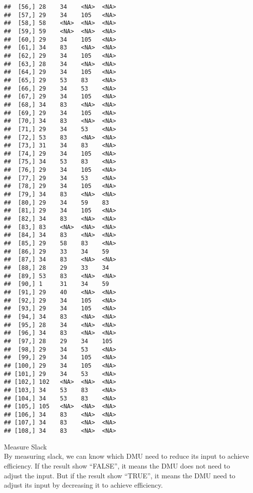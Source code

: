 \documentclass[
]{article}
\newenvironment{Shaded}{\begin{snugshade}}{\end{snugshade}}
\newcommand{\FunctionTok}[1]{\textcolor[rgb]{0.00,0.00,0.00}{#1}}
\newcommand{\NormalTok}[1]{#1}
\newcommand{\OtherTok}[1]{\textcolor[rgb]{0.56,0.35,0.01}{#1}}
\newcommand{\SpecialCharTok}[1]{\textcolor[rgb]{0.00,0.00,0.00}{#1}}
\begin{document}
\begin{verbatim}
##  [56,] 28    34    <NA>  <NA> 
##  [57,] 29    34    105   <NA> 
##  [58,] 58    <NA>  <NA>  <NA> 
##  [59,] 59    <NA>  <NA>  <NA> 
##  [60,] 29    34    105   <NA> 
##  [61,] 34    83    <NA>  <NA> 
##  [62,] 29    34    105   <NA> 
##  [63,] 28    34    <NA>  <NA> 
##  [64,] 29    34    105   <NA> 
##  [65,] 29    53    83    <NA> 
##  [66,] 29    34    53    <NA> 
##  [67,] 29    34    105   <NA> 
##  [68,] 34    83    <NA>  <NA> 
##  [69,] 29    34    105   <NA> 
##  [70,] 34    83    <NA>  <NA> 
##  [71,] 29    34    53    <NA> 
##  [72,] 53    83    <NA>  <NA> 
##  [73,] 31    34    83    <NA> 
##  [74,] 29    34    105   <NA> 
##  [75,] 34    53    83    <NA> 
##  [76,] 29    34    105   <NA> 
##  [77,] 29    34    53    <NA> 
##  [78,] 29    34    105   <NA> 
##  [79,] 34    83    <NA>  <NA> 
##  [80,] 29    34    59    83   
##  [81,] 29    34    105   <NA> 
##  [82,] 34    83    <NA>  <NA> 
##  [83,] 83    <NA>  <NA>  <NA> 
##  [84,] 34    83    <NA>  <NA> 
##  [85,] 29    58    83    <NA> 
##  [86,] 29    33    34    59   
##  [87,] 34    83    <NA>  <NA> 
##  [88,] 28    29    33    34   
##  [89,] 53    83    <NA>  <NA> 
##  [90,] 1     31    34    59   
##  [91,] 29    40    <NA>  <NA> 
##  [92,] 29    34    105   <NA> 
##  [93,] 29    34    105   <NA> 
##  [94,] 34    83    <NA>  <NA> 
##  [95,] 28    34    <NA>  <NA> 
##  [96,] 34    83    <NA>  <NA> 
##  [97,] 28    29    34    105  
##  [98,] 29    34    53    <NA> 
##  [99,] 29    34    105   <NA> 
## [100,] 29    34    105   <NA> 
## [101,] 29    34    53    <NA> 
## [102,] 102   <NA>  <NA>  <NA> 
## [103,] 34    53    83    <NA> 
## [104,] 34    53    83    <NA> 
## [105,] 105   <NA>  <NA>  <NA> 
## [106,] 34    83    <NA>  <NA> 
## [107,] 34    83    <NA>  <NA> 
## [108,] 34    83    <NA>  <NA>
\end{verbatim}

Measure Slack \\
By measuring slack, we can know which DMU need to reduce its input to
achieve efficiency. If the result show ``FALSE'', it means the DMU does
not need to adjust the input. But if the result show ``TRUE'', it means
the DMU need to adjust its input by decreasing it to achieve efficiency.

\begin{Shaded}
\end{Shaded}
\end{document}
